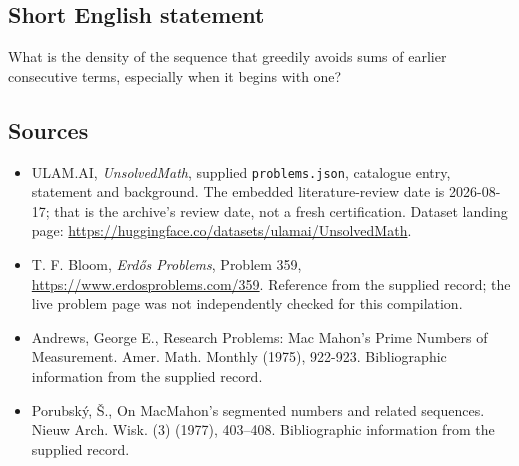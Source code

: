 \documentclass[11pt,a4paper]{article}
\begin{document}
\subsection{Short English statement}

What is the density of the sequence that greedily avoids sums of earlier consecutive terms, especially when it begins with one?

\subsection{Sources}

{\small

\begin{itemize}

\item[\hypertarget{source:statement:1}{S1}] ULAM.AI, \emph{UnsolvedMath}, supplied \texttt{problems.json}, catalogue entry, statement and background. The embedded literature-review date is 2026-08-17; that is the archive’s review date, not a fresh certification. Dataset landing page: \url{https://huggingface.co/datasets/ulamai/UnsolvedMath}.

\item[\hypertarget{source:statement:2}{S2}] T. F. Bloom, \emph{Erdős Problems}, Problem 359, \url{https://www.erdosproblems.com/359}. Reference from the supplied record; the live problem page was not independently checked for this compilation.

\item[\hypertarget{source:statement:3}{S3}] Andrews, George E., Research Problems: Mac Mahon's Prime Numbers of Measurement. Amer. Math. Monthly (1975), 922-923. Bibliographic information from the supplied record.

\item[\hypertarget{source:statement:4}{S4}] Porubsk\'y, \v S., On {M}ac{M}ahon's segmented numbers and related sequences. Nieuw Arch. Wisk. (3) (1977), 403--408. Bibliographic information from the supplied record.

\end{itemize}

}

\label{end:statement}
\end{document}
